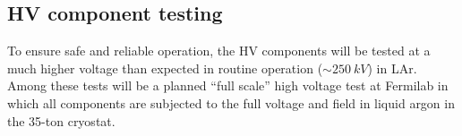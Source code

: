 \subsection{HV component testing}

To ensure safe and reliable operation, the HV components will be
tested at a much higher voltage than expected in routine operation
($\sim\SI{250}{kV}$) in LAr. Among these tests will be a planned
``full scale'' high voltage test at Fermilab in which all components
are subjected to the full voltage and field in liquid argon in the
35-ton cryostat. 
